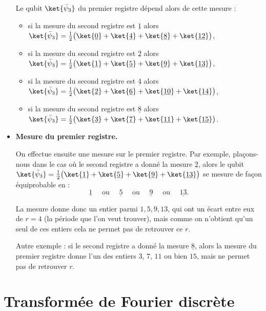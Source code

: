 \documentclass[11pt,class=report,crop=false]{standalone}
\begin{document}
\begin{itemize}
  Le qubit $\ket{\bar \psi_3}$ du premier registre dépend alors de cette mesure :
  \begin{itemize}
     \item si la mesure du second registre est $\underline1$ alors $\ket{\bar \psi_3} = \frac12\big( \ket{\underline{0}} + \ket{\underline{4}} + \ket{\underline{8}} + \ket{\underline{12}} \big)$,
     \item si la mesure du second registre est $\underline2$ alors $\ket{\bar \psi_3} = \frac12\big( \ket{\underline{1}} + \ket{\underline{5}} + \ket{\underline{9}} + \ket{\underline{13}} \big)$,
     \item si la mesure du second registre est $\underline4$ alors $\ket{\bar \psi_3} = \frac12\big( \ket{\underline{2}} + \ket{\underline{6}} + \ket{\underline{10}} + \ket{\underline{14}} \big)$,
     \item si la mesure du second registre est $\underline8$ alors $\ket{\bar \psi_3} = \frac12\big( \ket{\underline{3}} + \ket{\underline{7}} + \ket{\underline{11}} + \ket{\underline{15}} \big)$.
  \end{itemize}

  \item \textbf{Mesure du premier registre.}

  On effectue ensuite une mesure sur le premier registre. 
  Par exemple, plaçons-nous dans le cas où le second registre a donné la mesure $\underline2$, alors le qubit 
  $\ket{\bar \psi_3} = \frac12\big( \ket{\underline{1}} + \ket{\underline{5}} + \ket{\underline{9}} + \ket{\underline{13}} \big)$ se mesure de façon équiprobable en :
  $$\underline1 \quad \text{ ou } \quad \underline5 \quad \text{ ou } \quad \underline9 \quad \text{ ou } \quad \underline{13}.$$
  


  La mesure donne donc un entier parmi $1,5,9,13$, qui ont un écart entre eux de $r=4$ (la période que l'on veut trouver),
  mais comme on n'obtient qu'un seul de ces entiers cela ne permet pas de retrouver ce $r$.

  Autre exemple : si le second registre a donné la mesure $\underline8$, alors la mesure du premier registre donne l'un des entiers $3$, $7$, $11$ ou bien $15$, mais ne permet pas de retrouver $r$.

\end{itemize}
 

\section{Transformée de Fourier discrète}
\end{document}
